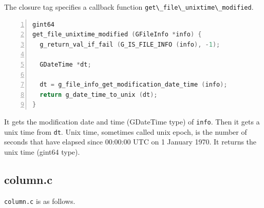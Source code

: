 The closure tag specifies a callback function
\passthrough{\lstinline!get\_file\_unixtime\_modified!}.

\begin{lstlisting}[language=C, numbers=left]
gint64
get_file_unixtime_modified (GFileInfo *info) {
  g_return_val_if_fail (G_IS_FILE_INFO (info), -1);

  GDateTime *dt;

  dt = g_file_info_get_modification_date_time (info);
  return g_date_time_to_unix (dt);
}
\end{lstlisting}

It gets the modification date and time (GDateTime type) of
\passthrough{\lstinline!info!}. Then it gets a unix time from
\passthrough{\lstinline!dt!}. Unix time, sometimes called unix epoch, is
the number of seconds that have elapsed since 00:00:00 UTC on 1 January
1970. It returns the unix time (gint64 type).

\hypertarget{column.c}{%
\subsection{column.c}\label{column.c}}

\passthrough{\lstinline!column.c!} is as follows.

